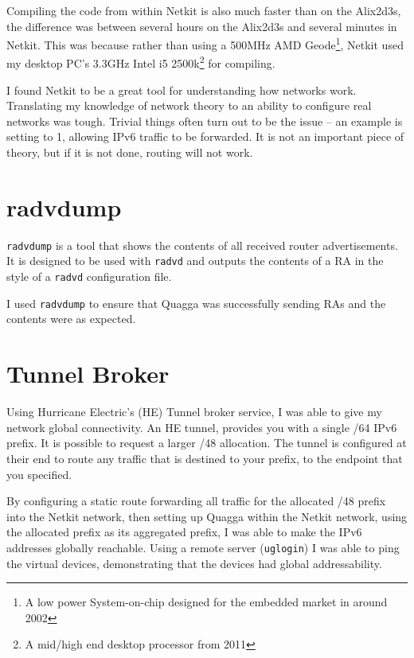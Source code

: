 \documentclass[12pt]{report}
\begin{document}
Compiling the code from within Netkit is also much faster than on the Alix2d3s,
the difference was between several hours on the Alix2d3s and several minutes in
Netkit. This was because rather than using a 500MHz AMD Geode\footnote{A low
power System-on-chip designed for the embedded market in around 2002}, Netkit
used my desktop PC's 3.3GHz Intel i5 2500k\footnote{A mid/high end desktop
processor from 2011} for compiling. 

I found Netkit to be a great tool for understanding how networks work.
Translating my knowledge of network theory to an ability to configure real
networks was tough. Trivial things often turn out to be the issue -- an example
is setting  to 1, allowing IPv6
traffic to be forwarded. It is not an important piece of theory, but if it is
not done, routing will not work. 


\section{radvdump}
\texttt{radvdump} is a tool that shows the contents of all
received router advertisements. It is designed to be used with
\texttt{radvd} and outputs the contents of a RA in the style of a
\texttt{radvd} configuration file. 

I used \texttt{radvdump} to ensure that Quagga was successfully sending RAs and
the contents were as expected. 


\section{Tunnel Broker}
Using Hurricane Electric's (HE) Tunnel broker service, I was able to give my
network global connectivity. An HE tunnel,
provides you with a single /64 IPv6 prefix. It is possible to request a larger
/48 allocation. The tunnel is configured at their end to route any traffic
that is destined to your prefix, to the endpoint that you specified.  

By configuring a static route forwarding all traffic for the allocated /48
prefix into the Netkit network, then setting up Quagga within the Netkit
network, using the allocated prefix as its aggregated prefix, I was able to
make the IPv6 addresses globally reachable. Using a remote server
(\texttt{uglogin}) I was able to ping the virtual devices, demonstrating that
the devices had global addressability.
\end{document}
